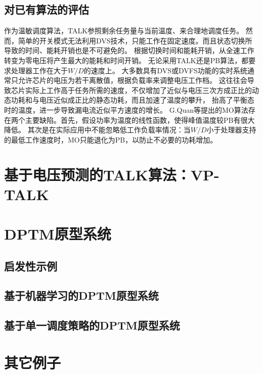 \subsection{对已有算法的评估}
作为温敏调度算法，TALK参照剩余任务量与当前温度、来合理地调度任务。 然而，简单的开关模式无法利用DVS技术，只能工作在固定速度。而且状态切换所导致的时间、能耗开销也是不可避免的。 根据切换时间和能耗开销，从全速工作转变为零电压将产生最大的能耗和时间开销。
无论采用TALK还是PB算法，都要求处理器工作在大于$W/D$的速度上。 大多数具有DVS或DVFS功能的实时系统通常只允许芯片的电压为若干离散值，根据负载率来调整电压工作档。 这往往会导致芯片实际上工作高于任务所需的速度，不仅增加了近似与电压三次方成正比的动态功耗和与电压近似成正比的静态功耗，而且加速了温度的攀升， 抬高了平衡态时的温度，进一步导致漏电流近似平方速度的增长。
G.Quan等提出的MO算法存在两个主要缺陷。首先，假设功率为温度的线性函数，使得峰值温度较PB有很大降低。 其次是在实际应用中不能忽略低工作负载率情况：当$W/D$小于处理器支持的最低工作速度时，MO只能退化为PB，以防止不必要的功耗增加。



\section{基于电压预测的TALK算法：VP-TALK}
\label{vp-talk}

\section{DPTM原型系统}
\label{DPTM-system}


\subsection{启发性示例}

\subsection{基于机器学习的DPTM原型系统}

\subsection{基于单一调度策略的DPTM原型系统}







\section{其它例子}
\label{sec:other}

